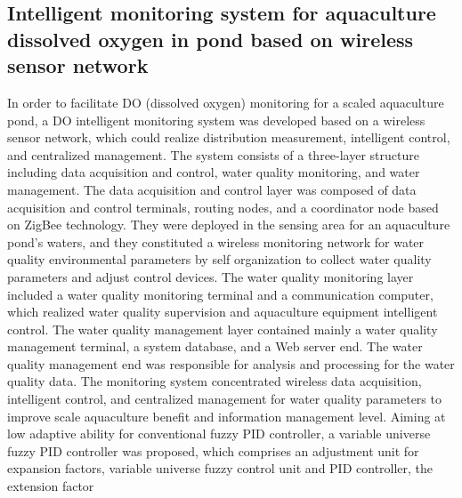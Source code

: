 \documentclass[12pt]{article}
\begin{document}
\subsection*{Intelligent monitoring system for aquaculture dissolved oxygen in pond based on wireless sensor network}
In order to facilitate DO (dissolved oxygen) monitoring for a scaled aquaculture pond, a DO intelligent monitoring system was developed based on a wireless sensor network, which could realize distribution measurement, intelligent control, and centralized management. The system consists of a three-layer structure including data acquisition and control, water quality monitoring, and water management. The data acquisition and control layer was composed of data acquisition and control terminals, routing nodes, and a coordinator node based on ZigBee technology. They were deployed in the sensing area for an aquaculture pond's waters, and they constituted a wireless monitoring network for water quality environmental parameters by self organization to collect water quality parameters and adjust control devices. The water quality monitoring layer included a water quality monitoring terminal and a communication computer, which realized water quality supervision and aquaculture equipment intelligent control. The water quality management layer contained mainly a water quality management terminal, a system database, and a Web server end. The water quality management end was responsible for analysis and processing for the water quality data. The monitoring system concentrated wireless data acquisition, intelligent control, and centralized management for water quality parameters to improve scale aquaculture benefit and information management level. Aiming at low adaptive ability for conventional fuzzy PID controller, a variable universe fuzzy PID controller was proposed, which comprises an adjustment unit for expansion factors, variable universe fuzzy control unit and PID controller, the extension factor 
\end{document}
